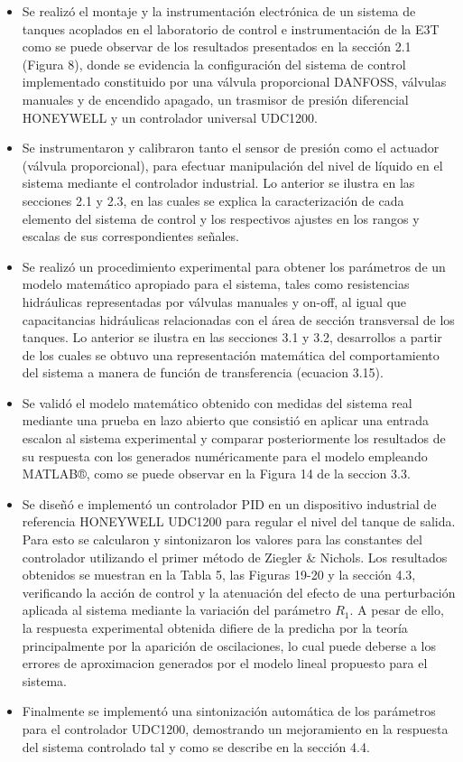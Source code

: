 \documentclass[a4paper,12pt,twoside]{proyectotanquesecci}
\begin{document}
\begin{itemize}
\item Se realizó el montaje y la instrumentación electrónica de un sistema de tanques acoplados en el laboratorio de control e instrumentación de la E3T como se puede observar de los resultados presentados en la sección 2.1 (Figura 8), donde se evidencia la configuración del sistema de control implementado constituido por una válvula proporcional DANFOSS, válvulas manuales y de encendido apagado, un trasmisor de presión diferencial HONEYWELL y un controlador universal UDC1200.
\item Se instrumentaron y calibraron tanto el sensor de presión como el actuador (válvula proporcional), para efectuar manipulación del nivel de líquido en el sistema mediante el controlador industrial. Lo anterior se ilustra en las secciones 2.1 y 2.3, en las cuales se explica la caracterización de cada elemento del sistema de control y los respectivos ajustes en los rangos y escalas de sus correspondientes señales.
\item Se realizó un procedimiento experimental para obtener los parámetros de un modelo matemático apropiado para el sistema, tales como resistencias hidráulicas representadas por válvulas manuales y on-off, al igual que capacitancias hidráulicas relacionadas con el área de sección transversal de los tanques. Lo anterior se ilustra en las secciones 3.1 y 3.2, desarrollos a partir de los cuales se obtuvo una representación matemática del comportamiento del sistema a manera de función de transferencia (ecuacion 3.15).
\item Se validó el modelo matemático obtenido con medidas del sistema real mediante una prueba en lazo abierto que consistió en aplicar una entrada escalon al sistema experimental y comparar posteriormente los resultados de su respuesta con los generados numéricamente para el modelo empleando MATLAB®, como se puede observar en la Figura 14 de la seccion 3.3.
\item Se diseñó e implementó un controlador PID en un dispositivo industrial de referencia HONEYWELL UDC1200 para regular el nivel del tanque de salida. Para esto se calcularon y sintonizaron los valores para las constantes del controlador utilizando el primer método de Ziegler \& Nichols. Los resultados obtenidos se muestran en la Tabla 5, las Figuras 19-20 y la sección 4.3, verificando la acción de control y la atenuación del efecto de una perturbación aplicada al sistema mediante la variación del parámetro $R_{1}$. A pesar de ello, la respuesta experimental obtenida difiere de la predicha por la teoría principalmente por la aparición de oscilaciones, lo cual puede deberse a los errores de aproximacion generados por el modelo lineal propuesto para el sistema.
\item Finalmente se implementó una sintonización automática de los parámetros para el controlador UDC1200, demostrando un mejoramiento en la respuesta del sistema controlado tal y como se describe en la sección 4.4.
\end{itemize}
\end{document}
